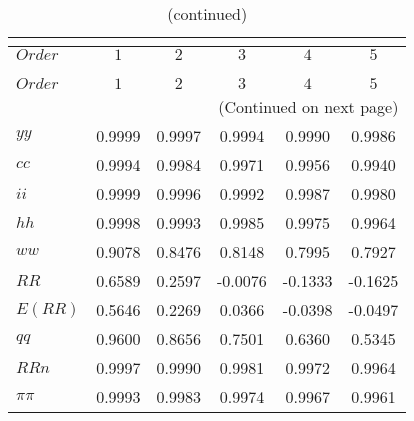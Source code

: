  
\begin{center}
\begin{longtable}{lccccc} 
\caption{COEFFICIENTS OF AUTOCORRELATION}\\
 \label{Table:th_autocorr_matrix}\\
\toprule 
$Order   $	 & 	 $         1$	 & 	 $         2$	 & 	 $         3$	 & 	 $         4$	 & 	 $         5$\\
\midrule \endfirsthead 
\caption{(continued)}\\
 \toprule \\ 
$Order   $	 & 	 $         1$	 & 	 $         2$	 & 	 $         3$	 & 	 $         4$	 & 	 $         5$\\
\midrule \endhead 
\midrule \multicolumn{6}{r}{(Continued on next page)} \\ \bottomrule \endfoot 
\bottomrule \endlastfoot 
$yy      $	 & 	    0.9999	 & 	    0.9997	 & 	    0.9994	 & 	    0.9990	 & 	    0.9986 \\ 
$cc      $	 & 	    0.9994	 & 	    0.9984	 & 	    0.9971	 & 	    0.9956	 & 	    0.9940 \\ 
$ii      $	 & 	    0.9999	 & 	    0.9996	 & 	    0.9992	 & 	    0.9987	 & 	    0.9980 \\ 
$hh      $	 & 	    0.9998	 & 	    0.9993	 & 	    0.9985	 & 	    0.9975	 & 	    0.9964 \\ 
$ww      $	 & 	    0.9078	 & 	    0.8476	 & 	    0.8148	 & 	    0.7995	 & 	    0.7927 \\ 
$RR      $	 & 	    0.6589	 & 	    0.2597	 & 	   -0.0076	 & 	   -0.1333	 & 	   -0.1625 \\ 
$E(RR)   $	 & 	    0.5646	 & 	    0.2269	 & 	    0.0366	 & 	   -0.0398	 & 	   -0.0497 \\ 
$qq      $	 & 	    0.9600	 & 	    0.8656	 & 	    0.7501	 & 	    0.6360	 & 	    0.5345 \\ 
$RRn     $	 & 	    0.9997	 & 	    0.9990	 & 	    0.9981	 & 	    0.9972	 & 	    0.9964 \\ 
$\pi\pi  $	 & 	    0.9993	 & 	    0.9983	 & 	    0.9974	 & 	    0.9967	 & 	    0.9961 \\ 
\end{longtable}
 \end{center}
